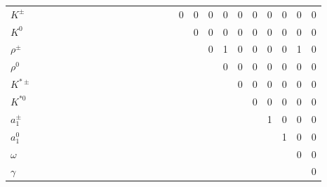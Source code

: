 \documentclass[6pt]{article}
\begin{document}
\begin{landscape}
\begin{tabular}{|l||cccc|cc|ccc|ccc|cccc|cccc|cccc|}
$K^{\pm}$  &  &  &  &  &  &  &  &  &  &  &  &  &  &  & 0 & 0 & 0 & 0 & 0 & 0 & 0 & 0 & 0 & 0 \\
$K^0$  &  &  &  &  &  &  &  &  &  &  &  &  &  &  &  & 0 & 0 & 0 & 0 & 0 & 0 & 0 & 0 & 0 \\
\hline 
$\rho^{\pm}$  &  &  &  &  &  &  &  &  &  &  &  &  &  &  &  &  & 0 & 1 & 0 & 0 & 0 & 0 & 1 & 0 \\
$\rho^0$  &  &  &  &  &  &  &  &  &  &  &  &  &  &  &  &  &  & 0 & 0 & 0 & 0 & 0 & 0 & 0 \\
$K^{*\pm}$  &  &  &  &  &  &  &  &  &  &  &  &  &  &  &  &  &  &  & 0 & 0 & 0 & 0 & 0 & 0 \\
$K^{*0}$  &  &  &  &  &  &  &  &  &  &  &  &  &  &  &  &  &  &  &  & 0 & 0 & 0 & 0 & 0 \\
\hline 
$a_1^{\pm}$  &  &  &  &  &  &  &  &  &  &  &  &  &  &  &  &  &  &  &  &  & 1 & 0 & 0 & 0 \\
$a_1^0$  &  &  &  &  &  &  &  &  &  &  &  &  &  &  &  &  &  &  &  &  &  & 1 & 0 & 0 \\
$\omega$  &  &  &  &  &  &  &  &  &  &  &  &  &  &  &  &  &  &  &  &  &  &  & 0 & 0 \\
$\gamma$  &  &  &  &  &  &  &  &  &  &  &  &  &  &  &  &  &  &  &  &  &  &  &  & 0 \\
\hline \end{tabular} \end{landscape}
\end{document}
